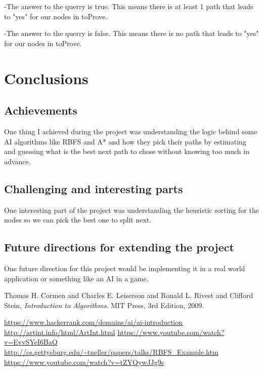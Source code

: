 \documentclass{article}
\begin{document}
\begin{itemize}
-The answer to the querry is true. This means there is at least 1 path that leads to "yes" for our nodes in toProve.

-The answer to the querry is false. This means there is no path that leads to "yes" for our nodes in toProve.
\pagebreak


\end{itemize}


\section{Conclusions}


\subsection{Achievements}
One thing I achieved during the project was understanding the logic behind some AI algorithms like RBFS and A* and how they pick their paths by estimating and guessing what is the best next path to chose without knowing too much in advance.
\subsection{Challenging and interesting	parts}
\sloppy
One interesting part of the project was understanding the heuristic sorting for the nodes so we can pick the best one to split next.
\linebreak
\subsection{Future directions for extending the project} 
One future direction for this project would be implementing it in a real world application or something like an AI in a game.
\pagebreak

\begin{thebibliography}{9}
	
	Thomas H. Cormen and Charles E. Leiserson and Ronald L. Rivest and Clifford Stein,
	\emph{Introduction to Algorithms}.
	MIT Press,
	3rd Edition,
	2009.
	
	\url{https://www.hackerrank.com/domains/ai/ai-introduction} \linebreak
	\url{http://artint.info/html/ArtInt.html}
	\linebreak
	\url{https://www.youtube.com/watch?v=EvvSYeI6BaQ}
	\linebreak
	\url{http://cs.gettysburg.edu/~tneller/papers/talks/RBFS_Example.htm}
		\linebreak
		\url{https://www.youtube.com/watch?v=tZYQywJJg9s}
		\linebreak
\end{thebibliography}
\end{document}
